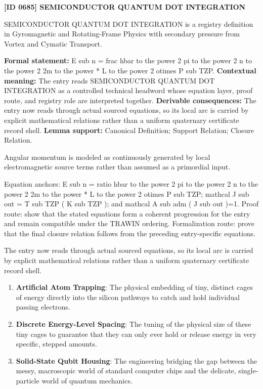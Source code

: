 \clearpage
\noindent\textbf{[ID 0685] SEMICONDUCTOR QUANTUM DOT INTEGRATION}\par
\vspace{0.35em}
\begingroup\small
{}
SEMICONDUCTOR QUANTUM DOT INTEGRATION is a registry definition in Gyromagnetic and Rotating-Frame Physics with secondary pressure from Vortex and Cymatic Transport.

\begingroup\footnotesize\setlength{\emergencystretch}{3em}\sloppy
\textbf{Formal statement:} E sub n = frac hbar to the power 2 pi to the power 2 n to the power 2 2m to the power * L to the power 2 otimes P sub TZP. \textbf{Contextual meaning:} The entry reads SEMICONDUCTOR QUANTUM DOT INTEGRATION as a controlled technical headword whose equation layer, proof route, and registry role are interpreted together. \textbf{Derivable consequences:} The entry now reads through actual sourced equations, so its local arc is carried by explicit mathematical relations rather than a uniform quaternary certificate record shell. \textbf{Lemma support:} Canonical Definition; Support Relation; Closure Relation.\par
\endgroup

Angular momentum is modeled as continuously generated by local electromagnetic source terms rather than assumed as a primordial input.

Equation anchors: E sub n = ratio hbar to the power 2 pi to the power 2 n to the power 2 2m to the power * L to the power 2 otimes P sub TZP; mathcal J sub out = T sub TZP ( K sub TZP ); and mathcal A sub adm ( J sub out )=1. Proof route: show that the stated equations form a coherent progression for the entry and remain compatible under the TRAWIN ordering. Formalization route: prove that the final closure relation follows from the preceding entry-specific equations.

The entry now reads through actual sourced equations, so its local arc is carried by explicit mathematical relations rather than a uniform quaternary certificate record shell.
\endgroup

\begin{enumerate}[leftmargin=1.6em,itemsep=6pt,topsep=4pt]
\item \textbf{Artificial Atom Trapping}: The physical embedding of tiny, distinct cages of energy directly into the silicon pathways to catch and hold individual passing electrons.
\item \textbf{Discrete Energy-Level Spacing}: The tuning of the physical size of these tiny cages to guarantee that they can only ever hold or release energy in very specific, stepped amounts.
\item \textbf{Solid-State Qubit Housing}: The engineering bridging the gap between the messy, macroscopic world of standard computer chips and the delicate, single-particle world of quantum mechanics.
\end{enumerate}

